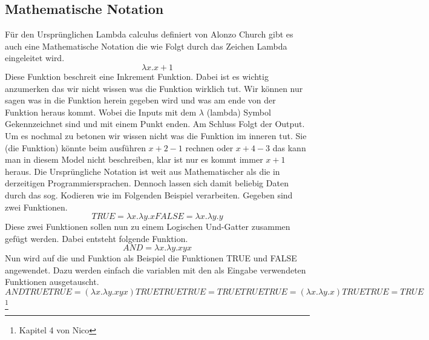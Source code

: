 \subsection{Mathematische Notation}
Für den Ursprünglichen Lambda calculus definiert von Alonzo Church gibt es auch 
eine Mathematische Notation die wie Folgt durch das Zeichen Lambda eingeleitet wird.
\begin{equation}
\lambda x. x + 1
\end{equation}
Diese Funktion beschreit eine Inkrement Funktion. Dabei ist es wichtig anzumerken das wir nicht wissen was die Funktion wirklich tut. Wir können nur sagen was in die Funktion herein gegeben wird und was am ende von der Funktion heraus kommt. Wobei die Inputs mit dem $\lambda$ (lambda) Symbol Gekennzeichnet sind und mit einem Punkt enden. Am Schluss Folgt der Output. Um es nochmal zu betonen wir wissen nicht was die Funktion im inneren tut. Sie (die Funktion) könnte beim ausführen $x + 2 - 1$ rechnen oder $x + 4 - 3$ das kann man in diesem Model nicht beschreiben, klar ist nur es kommt immer $x + 1$ heraus.
Die Ursprüngliche Notation ist weit aus Mathematischer als die in derzeitigen Programmiersprachen. Dennoch lassen sich damit beliebig Daten durch das sog. Kodieren wie im Folgenden Beispiel verarbeiten.
Gegeben sind zwei Funktionen.
\begin{equation}
TRUE = \lambda x. \lambda y. x
FALSE = \lambda x. \lambda y. y
\end{equation}
Diese zwei Funktionen sollen nun zu einem Logischen Und-Gatter zusammen gefügt werden.
Dabei entsteht folgende Funktion.
\begin{equation}
AND = \lambda x. \lambda y. x y x
\end{equation}
Nun wird auf die und Funktion als Beispiel die Funktionen TRUE und FALSE angewendet. Dazu werden einfach die variablen mit den als Eingabe verwendeten Funktionen ausgetauscht.
\begin{equation}
AND TRUE TRUE 
= (\lambda x. \lambda y. x y x) TRUE TRUE TRUE
= TRUE TRUE TRUE
= (\lambda x. \lambda y. x) TRUE TRUE
= TRUE
\end{equation}
\footnote{Kapitel 4 von Nico}\cite{lambdacalculus} 